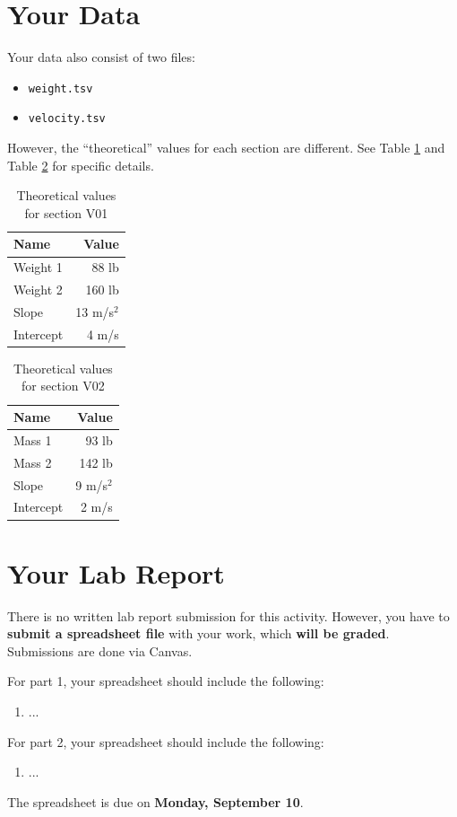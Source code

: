\section{Your Data}
Your data also consist of two files:
\begin{itemize}
    \item \texttt{weight.tsv}
    \item \texttt{velocity.tsv}
\end{itemize}
However, the ``theoretical'' values for each section are different. See Table \ref{table.00.theoretical.v01} and Table \ref{table.00.theoretical.v02} for specific details.
\begin{table}
    \centering
    \begin{tabular}{|l|r|}
        \hline
        \textbf{Name} & \textbf{Value} \\
        \hline
        Weight 1 & 88 lb \\
        Weight 2 & 160 lb \\
        \hline
        Slope & 13 m/s$^{2}$ \\
        Intercept & 4 m/s \\
        \hline
    \end{tabular}
    \caption{Theoretical values for section V01}
    \label{table.00.theoretical.v01}
\end{table}
\begin{table}
    \centering
    \begin{tabular}{|l|r|}
        \hline
        \textbf{Name} & \textbf{Value} \\
        \hline
        Mass 1 & 93 lb \\
        Mass 2 & 142 lb \\
        \hline
        Slope & 9 m/s$^{2}$ \\
        Intercept & 2 m/s \\
        \hline
    \end{tabular}
    \caption{Theoretical values for section V02}
    \label{table.00.theoretical.v02}
\end{table}
\section{Your Lab Report}
There is no written lab report submission for this activity. However, you have to \textbf{submit a spreadsheet file} with your work, which \textbf{will be graded}. Submissions are done via Canvas.

For part 1, your spreadsheet should include the following:
\begin{enumerate}
    \item ...
\end{enumerate}
For part 2, your spreadsheet should include the following:
\begin{enumerate}
    \item ...
\end{enumerate}
The spreadsheet is due on \textbf{Monday, September 10}.